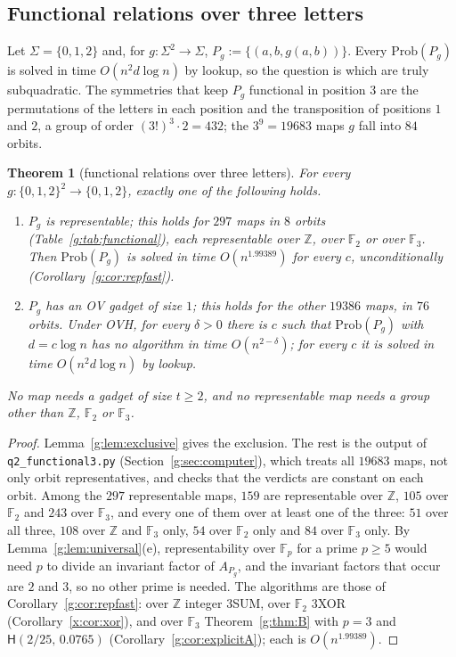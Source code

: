 \documentclass[11pt]{article}
\newtheorem{theorem}{Theorem}[section]
\theoremstyle{definition}
\theoremstyle{remark}
\newcommand{\Z}{\mathbb{Z}}
\newcommand{\F}{\mathbb{F}_2}
\newcommand{\Fp}{\mathbb{F}_p}
\newcommand{\Prob}{\mathrm{Prob}}
\newcommand{\Hyp}{\mathsf{H}}
\newcommand{\HypPrunedEps}{2/25}%
\newcommand{\HypPrunedGamma}{0.0765}%
\newcommand{\ExpBestUp}{1.99389}%
\begin{document}
\subsection{Functional relations over three letters}\label{g:sec:functional}

Let $\Sigma=\{0,1,2\}$ and, for $g\colon\Sigma^2\to\Sigma$, $P_g:=\{(a,b,g(a,b))\}$. Every $\Prob(P_g)$ is solved in time $O(n^2d\log n)$ by lookup, so the question is which are truly subquadratic. The symmetries that keep $P_g$ functional in position $3$ are the permutations of the letters in each position and the transposition of positions $1$ and $2$, a group of order $(3!)^3\cdot2=432$; the $3^9=19683$ maps $g$ fall into $84$ orbits.

\begin{theorem}[functional relations over three letters]\label{g:thm:E}
For every $g\colon\{0,1,2\}^2\to\{0,1,2\}$, exactly one of the following holds.
\begin{enumerate}[label=\textup{(\roman*)}]
\item $P_g$ is representable; this holds for $297$ maps in $8$ orbits (Table~\ref{g:tab:functional}), each representable over $\Z$, over $\F$ or over $\mathbb F_3$. Then $\Prob(P_g)$ is solved in time $O(n^{\ExpBestUp})$ for every $c$, unconditionally (Corollary~\ref{g:cor:repfast}).
\item $P_g$ has an OV gadget of size $1$; this holds for the other $19386$ maps, in $76$ orbits. Under OVH, for every $\delta>0$ there is $c$ such that $\Prob(P_g)$ with $d=c\log n$ has no algorithm in time $O(n^{2-\delta})$; for every $c$ it is solved in time $O(n^2d\log n)$ by lookup.
\end{enumerate}
No map needs a gadget of size $t\ge2$, and no representable map needs a group other than $\Z$, $\F$ or $\mathbb F_3$.
\end{theorem}

\begin{proof}
Lemma~\ref{g:lem:exclusive} gives the exclusion. The rest is the output of \texttt{q2\_functional3.py} (Section~\ref{g:sec:computer}), which treats all $19683$ maps, not only orbit representatives, and checks that the verdicts are constant on each orbit. Among the $297$ representable maps, $159$ are representable over $\Z$, $105$ over $\F$ and $243$ over $\mathbb F_3$, and every one of them over at least one of the three: $51$ over all three, $108$ over $\Z$ and $\mathbb F_3$ only, $54$ over $\F$ only and $84$ over $\mathbb F_3$ only. By Lemma~\ref{g:lem:universal}(e), representability over $\Fp$ for a prime $p\ge5$ would need $p$ to divide an invariant factor of $A_{P_g}$, and the invariant factors that occur are $2$ and $3$, so no other prime is needed. The algorithms are those of Corollary~\ref{g:cor:repfast}: over $\Z$ integer 3SUM, over $\F$ 3XOR (Corollary~\ref{x:cor:xor}), and over $\mathbb F_3$ Theorem~\ref{g:thm:B} with $p=3$ and $\Hyp(\HypPrunedEps,\,\HypPrunedGamma)$ (Corollary~\ref{g:cor:explicitA}); each is $O(n^{\ExpBestUp})$.
\end{proof}
\end{document}
